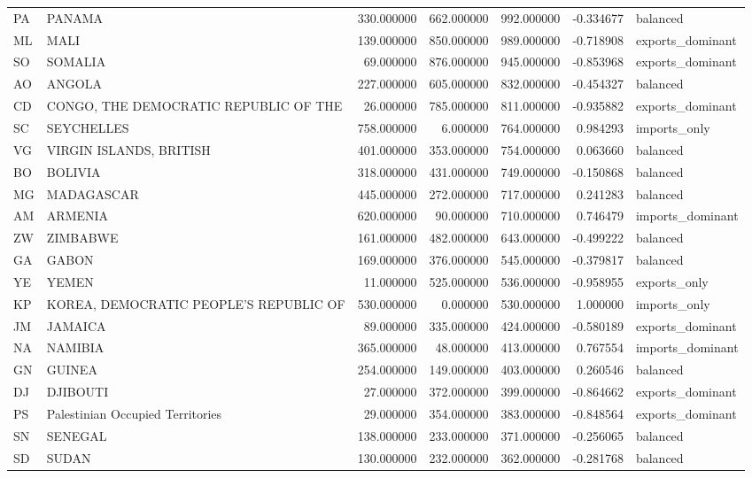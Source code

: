 \begin{tabular}{llrrrrl}
PA & PANAMA & 330.000000 & 662.000000 & 992.000000 & -0.334677 & balanced \\
ML & MALI & 139.000000 & 850.000000 & 989.000000 & -0.718908 & exports\_dominant \\
SO & SOMALIA & 69.000000 & 876.000000 & 945.000000 & -0.853968 & exports\_dominant \\
AO & ANGOLA & 227.000000 & 605.000000 & 832.000000 & -0.454327 & balanced \\
CD & CONGO, THE DEMOCRATIC REPUBLIC OF THE & 26.000000 & 785.000000 & 811.000000 & -0.935882 & exports\_dominant \\
SC & SEYCHELLES & 758.000000 & 6.000000 & 764.000000 & 0.984293 & imports\_only \\
VG & VIRGIN ISLANDS, BRITISH & 401.000000 & 353.000000 & 754.000000 & 0.063660 & balanced \\
BO & BOLIVIA & 318.000000 & 431.000000 & 749.000000 & -0.150868 & balanced \\
MG & MADAGASCAR & 445.000000 & 272.000000 & 717.000000 & 0.241283 & balanced \\
AM & ARMENIA & 620.000000 & 90.000000 & 710.000000 & 0.746479 & imports\_dominant \\
ZW & ZIMBABWE & 161.000000 & 482.000000 & 643.000000 & -0.499222 & balanced \\
GA & GABON & 169.000000 & 376.000000 & 545.000000 & -0.379817 & balanced \\
YE & YEMEN & 11.000000 & 525.000000 & 536.000000 & -0.958955 & exports\_only \\
KP & KOREA, DEMOCRATIC PEOPLE'S REPUBLIC OF & 530.000000 & 0.000000 & 530.000000 & 1.000000 & imports\_only \\
JM & JAMAICA & 89.000000 & 335.000000 & 424.000000 & -0.580189 & exports\_dominant \\
NA & NAMIBIA & 365.000000 & 48.000000 & 413.000000 & 0.767554 & imports\_dominant \\
GN & GUINEA & 254.000000 & 149.000000 & 403.000000 & 0.260546 & balanced \\
DJ & DJIBOUTI & 27.000000 & 372.000000 & 399.000000 & -0.864662 & exports\_dominant \\
PS & Palestinian Occupied Territories & 29.000000 & 354.000000 & 383.000000 & -0.848564 & exports\_dominant \\
SN & SENEGAL & 138.000000 & 233.000000 & 371.000000 & -0.256065 & balanced \\
SD & SUDAN & 130.000000 & 232.000000 & 362.000000 & -0.281768 & balanced \\

\end{tabular}
